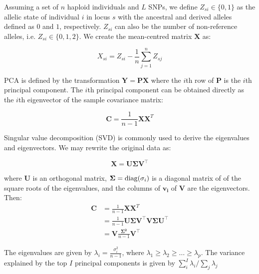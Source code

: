 Assuming a set of $n$ haploid individuals and $L$ SNPs, we define $Z_{si}\in\{0,1\}$ as the allelic state of individual $i$ in locus $s$ with the ancestral and derived alleles defined as $0$ and $1$, respectively. $Z_{si}$ can also be the number of non-reference alleles, i.e. $Z_{si} \in \{0,1,2\}$. We create the mean-centred matrix $\mathbf{X}$ as:

\[ X_{si} = Z_{si} - \frac{1}{n}\sum_{j=1}^{n}Z_{sj} \]

PCA is defined by the transformation $\mathbf{Y}=\mathbf{PX}$ where the $i$th row of $\mathbf{P}$ is the $i$th principal component. The $i$th principal component can be obtained directly as the $i$th eigenvector of the sample covariance matrix:

\[ \mathbf{C} = \frac{1}{n-1}\mathbf{XX}^T \]

Singular value decomposition (SVD) is commonly used to derive the eigenvalues and eigenvectors. We may rewrite the original data as:

\[ \mathbf{X} = \mathbf{U} \mathbf{\Sigma} \mathbf{V}^\intercal \]

where $\mathbf{U}$ is an orthogonal matrix, $\mathbf{\Sigma} = \operatorname{diag}(\sigma_{i})$ is a diagonal matrix of of the square roots of the eigenvalues, and the columns of $\mathbf{v_{i}}$ of $\mathbf{V}$ are the eigenvectors. Then:
\begin{align*}
 \mathbf{C} &= \frac{1}{n-1}\mathbf{XX}^T \\
&=  \frac{1}{n-1} \mathbf{U} \mathbf{\Sigma} \mathbf{V}^\intercal \mathbf{V} \mathbf{\Sigma} \mathbf{U}^\intercal  \\
&= \mathbf{V}\frac{\mathbf{\Sigma^2}}{n-1}\mathbf{V}^\intercal
\end{align*}

The eigenvalues are given by $\lambda_{i} = \frac{\sigma_{i}^{2}}{n-1}$, where $\lambda_{1} \ge \lambda_{2} \ge \dots \ge \lambda_{p}$. The variance explained by the top $I$ principal components is given by $\sum_{i}^{I}\lambda_{i}/\sum_{j}\lambda_{j}$